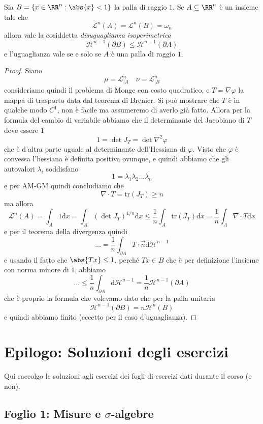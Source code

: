 \documentclass[11pt]{scrartcl}
\newcommand{\dif}{\text{d}}
\newcommand{\tr}[1]{\text{tr}\!\left(#1\right)}
\begin{document}
	\begin{proposition}
		Sia $B=\left\{x\in \RR^n:\abs{x}<1\right\}$ la palla di raggio $1$. Se $A\subseteq\RR^n$ è un insieme tale che 
		$$\mathscr{L}^n(A)=\mathscr{L}^n(B)=\omega_n$$
		allora vale la cosiddetta \textit{disuguaglianza isoperimetrica}
		$$\mathcal{H}^{n-1}(\partial B)\le \mathcal{H}^{n-1}(\partial A)$$
		e l'uguaglianza vale se e solo se $A$ è una palla di raggio $1$.
	\end{proposition}
	\begin{proof}
		Siano 
		$$\mu =\mathscr{L}^n_{\mid A}\quad \nu=\mathscr{L}^n_{\mid B}$$
		consideriamo quindi il problema di Monge con costo quadratico, e $T=\nabla \varphi$ la mappa di trasporto data dal teorema di Brenier. Si può mostrare che $T$ è in qualche modo $C^1$, non è facile ma assumeremo di averlo già fatto. Allora per la formula del cambio di variabile abbiamo che il determinante del Jacobiano di $T$ deve essere $1$
		$$1=\det J_T=\det \nabla^2\varphi$$
		che è d'altra parte uguale al determinante dell'Hessiana di $\varphi$. Visto che $\varphi$ è convessa l'hessiana è definita positiva ovunque, e quindi abbiamo che gli autovalori $\lambda_i$ soddisfano
		$$1=\lambda_1\lambda_2\dots\lambda_n$$
		e per AM-GM quindi concludiamo che
		$$\nabla \cdot T=\tr{J_T}\ge n$$
		ma allora
		$$\mathscr{L}^n(A)=\int_A1\dif x=\int_A\left(\det J_T\right)^{1/n}\dif x\le \frac{1}{n}\int_A\tr{J_T}\dif x =\frac{1}{n}\int_A \nabla \cdot T \dif x$$
		e per il teorema della divergenza quindi
		$$\dots = \frac{1}{n}\int_{\partial A} T\cdot \vec{n}\dif \mathcal{H}^{n-1}$$
		e usando il fatto che $\abs{Tx}\le 1$, perché $Tx\in B$ che è per definizione l'insieme con norma minore di $1$, abbiamo
		$$\dots \le \frac{1}{n}\int_{\partial A} \dif \mathcal H^{n-1}=\frac{1}{n}\mathcal{H}^{n-1}(\partial A)$$
		che è proprio la formula che volevamo dato che per la palla unitaria 
		$$\mathcal{H}^{n-1}(\partial B)=n\mathcal{H}^n(B)$$
		e quindi abbiamo finito (eccetto per il caso d'uguaglianza).
	\end{proof}
	
	\newpage
	
	\section{Epilogo: Soluzioni degli esercizi}
	
	Qui raccolgo le soluzioni agli esercizi dei fogli di esercizi dati durante il corso (e non).
	
	\subsection{Foglio 1: Misure e $\sigma$-algebre}
	
\end{document}
